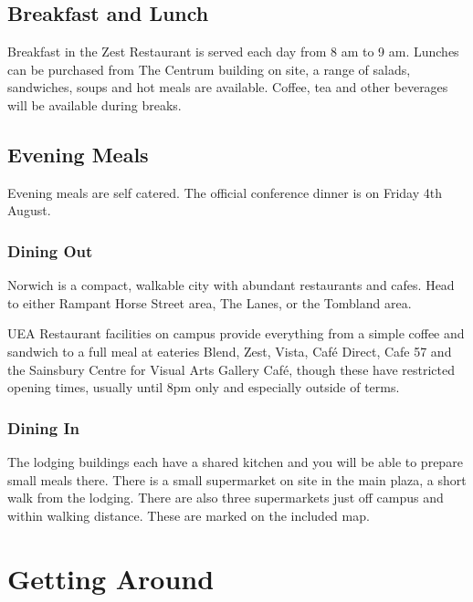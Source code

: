\documentclass[12pt,]{book}
\begin{document}
\subsection*{Breakfast and Lunch}\label{breakfast-and-lunch}

Breakfast in the Zest Restaurant is served each day from 8 am to 9 am.
Lunches can be purchased from The Centrum building on site, a range of
salads, sandwiches, soups and hot meals are available. Coffee, tea and
other beverages will be available during breaks.

\subsection*{Evening Meals}\label{evening-meals}

Evening meals are self catered. The official conference dinner is on
Friday 4th August.

\subsubsection*{Dining Out}\label{dining-out}

Norwich is a compact, walkable city with abundant restaurants and cafes.
Head to either Rampant Horse Street area, The Lanes, or the Tombland
area.

UEA Restaurant facilities on campus provide everything from a simple
coffee and sandwich to a full meal at eateries Blend, Zest, Vista, Café
Direct, Cafe 57 and the Sainsbury Centre for Visual Arts Gallery Café,
though these have restricted opening times, usually until 8pm only and
especially outside of terms.

\subsubsection*{Dining In}\label{dining-in}

The lodging buildings each have a shared kitchen and you will be able to
prepare small meals there. There is a small supermarket on site in the
main plaza, a short walk from the lodging. There are also three
supermarkets just off campus and within walking distance. These are
marked on the included map.

\section*{Getting Around}\label{getting-around}
\end{document}

